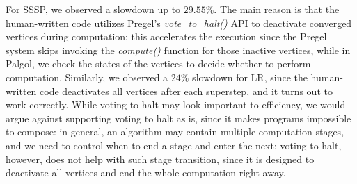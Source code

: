 \documentclass{sokendai_thesis} %
\begin{document}
For SSSP, we observed a slowdown up to $29.55\%$.
The main reason is that the human-written code utilizes Pregel's \textit{vote\_to\_halt()} API to deactivate converged vertices during computation;
this accelerates the execution since the Pregel system skips invoking the \emph{compute()} function for those inactive vertices, while in Palgol, we check the states of the vertices to decide whether to perform computation.
Similarly, we observed a $24\%$ slowdown for LR, since the human-written code deactivates all vertices after each superstep, and it turns out to work correctly.
While voting to halt may look important to efficiency, we would argue against supporting voting to halt as is, since it makes programs impossible to compose:
in general, an algorithm may contain multiple computation stages, and we need to control when to end a stage and enter the next; voting to halt, however, does not help with such stage transition, since it is designed to deactivate all vertices and end the whole computation right away.

\end{document}
